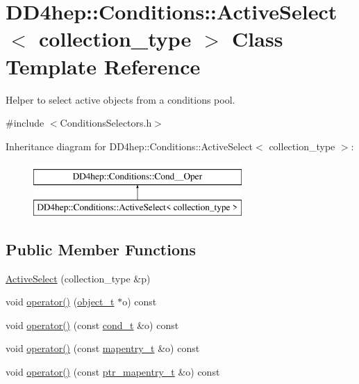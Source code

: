 \hypertarget{class_d_d4hep_1_1_conditions_1_1_active_select}{}\section{D\+D4hep\+:\+:Conditions\+:\+:Active\+Select$<$ collection\+\_\+type $>$ Class Template Reference}
\label{class_d_d4hep_1_1_conditions_1_1_active_select}


Helper to select active objects from a conditions pool.  




{\ttfamily \#include $<$Conditions\+Selectors.\+h$>$}

Inheritance diagram for D\+D4hep\+:\+:Conditions\+:\+:Active\+Select$<$ collection\+\_\+type $>$\+:\begin{figure}[H]
\begin{center}
\leavevmode
\includegraphics[height=2.000000cm]{class_d_d4hep_1_1_conditions_1_1_active_select}
\end{center}
\end{figure}
\subsection*{Public Member Functions}
\begin{DoxyCompactItemize}
\item 
\hyperlink{class_d_d4hep_1_1_conditions_1_1_active_select_a2d9d54374f340a323ce197c662669427}{Active\+Select} (collection\+\_\+type \&p)
\item 
void \hyperlink{class_d_d4hep_1_1_conditions_1_1_active_select_a4e7bd6374aeb6d984277d7f6a7513438}{operator()} (\hyperlink{class_d_d4hep_1_1_conditions_1_1_cond_____oper_a4229491e49bfd21058dff10125a73f63}{object\+\_\+t} $\ast$o) const
\item 
void \hyperlink{class_d_d4hep_1_1_conditions_1_1_active_select_a7a4ce2ce3b9e622bd88720e6f23f5358}{operator()} (const \hyperlink{class_d_d4hep_1_1_conditions_1_1_cond_____oper_aceca9f6a0e8c84364946eace47275d09}{cond\+\_\+t} \&o) const
\item 
void \hyperlink{class_d_d4hep_1_1_conditions_1_1_active_select_a3c401bdf333aafce29bd98764df55b97}{operator()} (const \hyperlink{class_d_d4hep_1_1_conditions_1_1_cond_____oper_a877dac3da66795207aed15be219acbdc}{mapentry\+\_\+t} \&o) const
\item 
void \hyperlink{class_d_d4hep_1_1_conditions_1_1_active_select_a3ef8ddc81bc1994973be61524316198a}{operator()} (const \hyperlink{class_d_d4hep_1_1_conditions_1_1_cond_____oper_a0949e4bd5f90cd3fae2394cf30983973}{ptr\+\_\+mapentry\+\_\+t} \&o) const
\end{DoxyCompactItemize}
